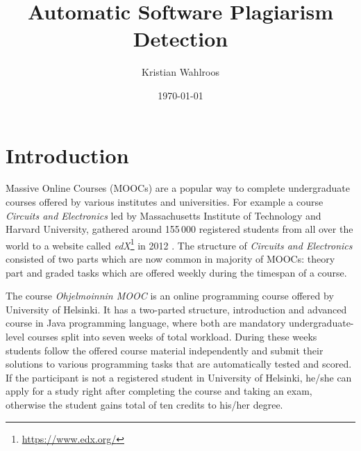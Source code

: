 \documentclass[english, grading]{tktltiki2}
\title{Automatic Software Plagiarism Detection}
\author{Kristian Wahlroos}
\date{\today}
\theoremstyle{definition}
\theoremstyle{remark}
\numberwithin{equation}{section} %
\begin{document}
 
\lstset{style=mystyle}



\frontmatter      %

\maketitle        %
\makeabstract     %

\tableofcontents  %


\mainmatter       %

\section{Introduction}


Massive Online Courses (MOOCs) are a popular way to complete undergraduate courses offered by various institutes and universities. For example a course \emph{Circuits and Electronics} led by Massachusetts Institute of Technology and Harvard University, gathered around 155\,000 registered students from all over the world to a website called \emph{edX}\footnote{\url{https://www.edx.org/}} in 2012 \cite{SLWCRFM2013}. The structure of \emph{Circuits and Electronics} consisted of two parts which are now common in majority of MOOCs: theory part and graded tasks which are offered weekly during the timespan of a course. 

The course \emph{Ohjelmoinnin MOOC} is an online programming course offered by University of Helsinki. It has a two-parted structure, introduction and advanced course in Java programming language, where both are mandatory undergraduate-level courses split into seven weeks of total workload. During these weeks students follow the offered course material independently and submit their solutions to various programming tasks that are automatically tested and scored. If the participant is not a registered student in University of Helsinki, he/she can apply for a study right after completing the course and taking an exam, otherwise the student gains total of ten credits to his/her degree. 
\end{document}
